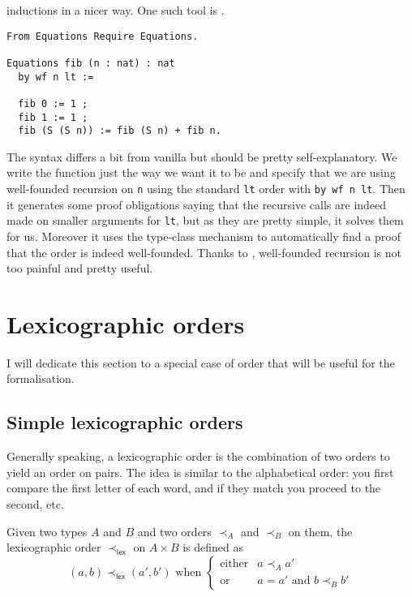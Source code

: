 inductions in a nicer way. One such tool is \Equations.
\begin{verbatim}
From Equations Require Equations.

Equations fib (n : nat) : nat
  by wf n lt :=

  fib 0 := 1 ;
  fib 1 := 1 ;
  fib (S (S n)) := fib (S n) + fib n.
\end{verbatim}
The syntax differs a bit from vanilla \Coq but should be pretty
self-explanatory. We write the function just the way we want it to be and
specify that we are using well-founded recursion on \texttt{n}
using the standard \texttt{lt} order with \texttt{by wf n lt}.
Then it generates some proof obligations saying that the recursive calls are
indeed made on smaller arguments for \texttt{lt}, but as they are
pretty simple, it solves them for us.
Moreover it uses the type-class mechanism to automatically find a proof that
the order is indeed well-founded.
Thanks to \Equations, well-founded recursion is not too painful and pretty
useful.

\section{Lexicographic orders}

I will dedicate this section to a special case of order that will be useful for
the formalisation.

\subsection{Simple lexicographic orders}

Generally speaking, a lexicographic order is the combination of two orders to
yield an order on pairs. The idea is similar to the alphabetical order:
you first compare the first letter of each word, and if they match you
proceed to the second, etc.

\begin{definition}
  Given two types \(A\) and \(B\) and two orders \(\prec_A\) and \(\prec_B\)
  on them, the lexicographic order \(\prec_{\mathsf{lex}}\) on \(A \times B\)
  is defined as
  \[
    (a,b) \prec_{\mathsf{lex}} (a',b')
    \text{ when }
    \left\{
    \begin{array}{ll}
      \text{either} & a \prec_A a' \\
      \text{or} & a = a' \text{ and } b \prec_B b'
    \end{array}
    \right.
  \]
\end{definition}

